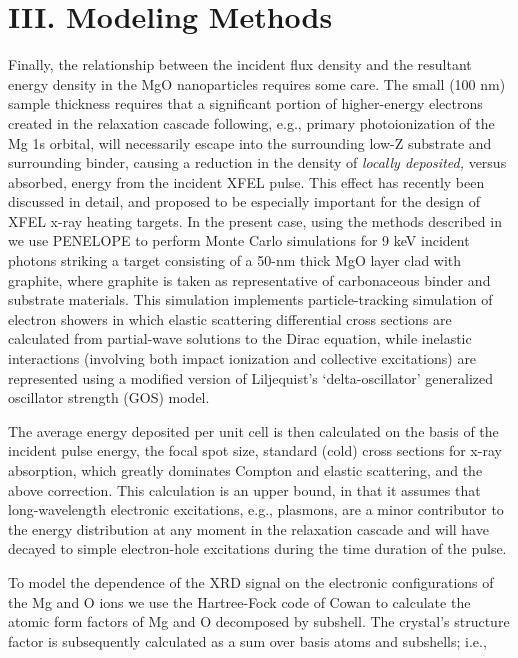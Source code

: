 \section{III. Modeling Methods}

Finally, the relationship between the incident flux density and the
resultant energy density in the MgO nanoparticles requires some care.
The small (100 nm) sample thickness requires that a significant portion
of higher-energy electrons created in the relaxation cascade following,
e.g., primary photoionization of the Mg 1s orbital, will necessarily
escape into the surrounding low-Z substrate and surrounding binder,
causing a reduction in the density of \emph{locally deposited,} versus
absorbed, energy from the incident XFEL pulse. This effect has recently
been discussed in detail, and proposed to be especially important for
the design of XFEL x-ray heating targets. \cite{hoidn2017nonlocal} In the present case,
using the methods described in \cite{hoidn2017nonlocal} we use PENELOPE to perform Monte
Carlo simulations for 9 keV incident photons striking a target
consisting of a 50-nm thick MgO layer clad with graphite, where graphite
is taken as representative of carbonaceous binder and substrate
materials. This simulation implements particle-tracking simulation of
electron showers in which elastic scattering differential cross sections
are calculated from partial-wave solutions to the Dirac equation, while
inelastic interactions (involving both impact ionization and collective
excitations) are represented using a modified version of Liljequist's
`delta-oscillator' generalized oscillator strength (GOS) model. \cite{hoidn2017nonlocal}

The average energy deposited per unit cell is then calculated on the
basis of the incident pulse energy, the focal spot size, standard (cold)
cross sections for x-ray absorption, which greatly dominates Compton and
elastic scattering, and the above correction. This calculation is an
upper bound, in that it assumes that long-wavelength electronic
excitations, e.g., plasmons, are a minor contributor to the energy
distribution at any moment in the relaxation cascade and will have
decayed to simple electron-hole excitations during the time duration of
the pulse.

To model the dependence of the XRD signal on the electronic
configurations of the Mg and O ions we use the Hartree-Fock code of
Cowan \cite{abdallah1988theoretical} to calculate the atomic form factors of Mg and O
decomposed by subshell. The crystal's structure factor is subsequently
calculated as a sum over basis atoms and subshells; i.e.,

